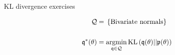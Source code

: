 
\newcommand{\TikzPtheta}[2]{
\draw[#1] (4.5, 3)  node[anchor=north] {#2};
\begin{scope}[shift={(2.5,2.5)}]
    \begin{scope}[rotate=45]
        \begin{scope}[shift={(-2.5,-2.5)}]
            \foreach \s in {0.2, 0.4, 0.6, 0.8, 1.0}
            \draw[#1] (2.5,2.5) ellipse (\s * 3 and \s * 1);
        \end{scope}
    \end{scope}
\end{scope}
}


\newcommand{\TikzPlotArea}{
\draw (0,0)--(5,0);
\foreach \x in {0,...,5}
  \draw (\x,0)--(\x,-.1) node[anchor=north]{};

\draw (0,0)--(0,5);
\foreach \y in {0,...,5}
  \draw (0,\y)--(-.1,\y) node[anchor=east] {};

\draw (0,5) node[anchor=east] {$\theta_2$};
\draw (5,0) node[anchor=north] {$\theta_1$};
}



\begin{frame}{KL divergence exercises}
\begin{minipage}{0.5\textwidth}
\begin{align*}
%
\qdom ={}& \left\{ \textrm{Bivariate normals}\right\}\\
\\
\qopt(\theta) ={}& \argmin{\q \in \qdom} \kl{\q(\theta)}{\p(\theta)}
%
\end{align*}
%
\end{minipage}
%
\begin{minipage}{0.4\textwidth}

\end{minipage}

\end{frame}



